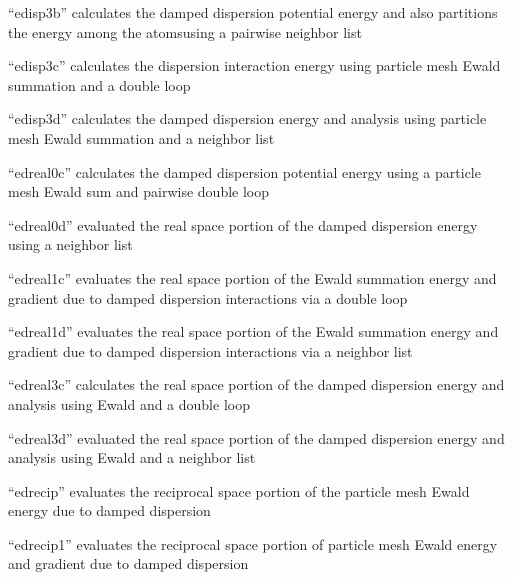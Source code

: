 \documentclass[letterpaper,11pt,english]{sphinxmanual}
\begin{document}
“edisp3b” calculates the damped dispersion potential energy
and also partitions the energy among the atomsusing a pairwise
neighbor list


“edisp3c” calculates the dispersion interaction energy using
particle mesh Ewald summation and a double loop


“edisp3d” calculates the damped dispersion energy and analysis
using particle mesh Ewald summation and a neighbor list


“edreal0c” calculates the damped dispersion potential energy
using a particle mesh Ewald sum and pairwise double loop


“edreal0d” evaluated the real space portion of the damped
dispersion energy using a neighbor list


“edreal1c” evaluates the real space portion of the Ewald
summation energy and gradient due to damped dispersion
interactions via a double loop


“edreal1d” evaluates the real space portion of the Ewald
summation energy and gradient due to damped dispersion
interactions via a neighbor list


“edreal3c” calculates the real space portion of the damped
dispersion energy and analysis using Ewald and a double loop


“edreal3d” evaluated the real space portion of the damped
dispersion energy and analysis using Ewald and a neighbor list


“edrecip” evaluates the reciprocal space portion of the particle
mesh Ewald energy due to damped dispersion


“edrecip1” evaluates the reciprocal space portion of particle
mesh Ewald energy and gradient due to damped dispersion

\end{document}
